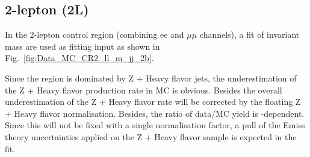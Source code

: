 \subsection{2-lepton (2L)}
\par In the 2-lepton control region (combining ee and $\mu\mu$ channels), a fit of invariant mass are used as fitting input as shown in Fig.~\ref{fig:Data_MC_CR2_ll_m_jj_2b}. 
\par Since the region is dominated by Z + Heavy flavor jets, the underestimation of the Z + Heavy flavor production rate in MC is obvious. Besides the overall underestimation of the Z + Heavy flavor rate will be corrected by the floating Z + Heavy flavor normalisation.
Besides, the ratio of data/MC yield is \met-dependent. Since this will not be fixed with a single normalisation factor, a pull of the Emiss theory uncertainties applied on the
Z + Heavy flavor sample is expected in the fit.
